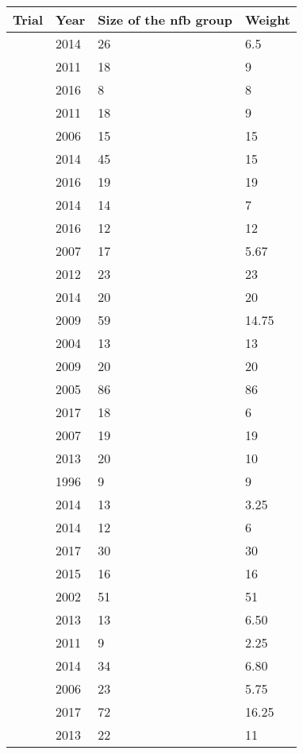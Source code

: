 \scriptsize
\begin{tabular}{ |p{4cm}|p{3cm}|p{3cm}|p{3cm}| }
\hline
Trial & Year & Size of the \gls{nfb} group & Weight \\
\hline
\citeauthor{Arnold2014} & 2014 & 26 & 6.5\\ 
\citeauthor{Bakhshayesh2011} & 2011 & 18 & 9\\
\citeauthor{Baumeister2016} & 2016 & 8 & 8\\
\citeauthor{Bakhshayesh2011} & 2011 & 18 & 9\\
\citeauthor{Beauregard2006} & 2006 & 15 & 15\\
\citeauthor{Bink2014} & 2014 & 45 & 15\\
\citeauthor{Bluschke2016} & 2016 & 19 & 19\\
\citeauthor{Christiansen2014} & 2014 & 14 & 7\\
\citeauthor{Deilami2016} & 2016 & 12 & 12\\
\citeauthor{Drechsler2007} & 2007 & 17 & 5.67\\
\citeauthor{Duric2012} & 2012 & 23 & 23\\
\citeauthor{Escolano2014} & 2014 & 20 & 20\\
\citeauthor{Gevensleben2009} & 2009 & 59 & 14.75\\
\citeauthor{Heinrich2004} & 2004 & 13 & 13\\
\citeauthor{Holtmann2009} & 2009 & 20 & 20\\
\citeauthor{Kropotov2005} & 2005 & 86 & 86\\
\citeauthor{Lee2017} & 2017 & 18 & 6\\
\citeauthor{Leins2007} & 2007 & 19 & 19\\
\citeauthor{Li2013} & 2013 & 20 & 10\\
\citeauthor{Linden1996} & 1996 & 9 & 9\\
\citeauthor{Maurizio2014} & 2014 & 13 & 3.25\\
\citeauthor{Meisel2014} & 2014 & 12 & 6\\
\citeauthor{Mohagheghi2017} & 2017 & 30 & 30\\
\citeauthor{Mohammadi2015} & 2015 & 16 & 16\\
\citeauthor{Monastra2002} & 2002 & 51 & 51\\
\citeauthor{Ogrim2013} & 2013 & 13 & 6.50\\
\citeauthor{Steiner2011} & 2011 & 9 & 2.25\\
\citeauthor{Steiner2014} & 2014 & 34 & 6.80\\
\citeauthor{Strehl2006} & 2006 & 23 & 5.75\\
\citeauthor{Strehl2017} & 2017 & 72 & 16.25\\
\citeauthor{VanDongen2013} & 2013 & 22 & 11\\
\hline
\end{tabular}
